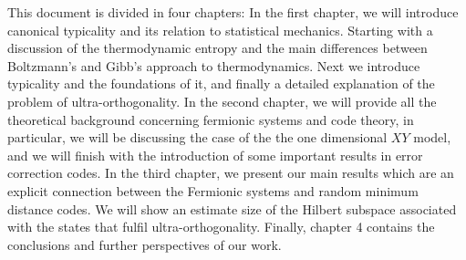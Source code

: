 


\indent This document is divided in four chapters: In the first chapter, we will introduce canonical typicality and its relation to statistical mechanics. Starting with a discussion of the thermodynamic entropy and the main differences between Boltzmann's  and Gibb's approach to thermodynamics. Next we introduce typicality and the foundations of it, and finally a detailed explanation of the problem of ultra-orthogonality. In the second chapter, we will provide all the theoretical background concerning fermionic systems and code theory, in particular, we will be discussing the case of the the one dimensional $XY$ model, and we will finish with the introduction of some important results in error correction codes. In the third chapter, we present our main results which are an explicit connection between the Fermionic systems and random minimum distance codes. We will show an estimate size of the Hilbert subspace associated with the states that fulfil ultra-orthogonality. Finally, chapter 4 contains the conclusions and further perspectives of our work.

